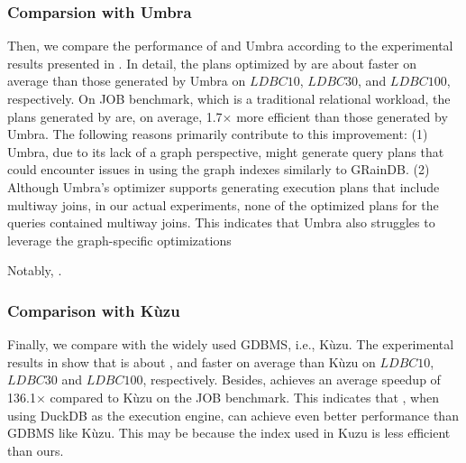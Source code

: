 \subsubsection{Comparsion with Umbra}
Then, we compare the performance of \name and Umbra according to the experimental results presented in .
In detail, the plans optimized by \name are about  faster on average than those generated by Umbra on $LDBC10$, $LDBC30$, and $LDBC100$, respectively.
On JOB benchmark, which is a traditional relational workload, the plans generated by \name are, on average, 1.7$\times$ more efficient than those generated by Umbra.
The following reasons primarily contribute to this improvement:
(1) Umbra, due to its lack of a graph perspective, might generate query plans that could encounter issues in using the graph indexes similarly to GRainDB.
(2) Although Umbra's optimizer supports generating execution plans that include multiway joins, in our actual experiments, none of the optimized plans for the queries contained multiway joins. This indicates that Umbra also struggles to leverage the graph-specific optimizations

Notably, .


\subsubsection{Comparison with K\`uzu}
Finally, we compare \name with the widely used GDBMS, i.e., K\`uzu.
The experimental results in  show that \name is about ,  and  faster on average than K\`uzu on $LDBC10$, $LD BC30$ and $LDBC100$, respectively.
Besides, \name achieves an average speedup of 136.1$\times$ compared to K\`uzu on the JOB benchmark.
This indicates that \name, when using DuckDB as the execution engine, can achieve even better performance than GDBMS like K\`uzu.
This may be because the index used in Kuzu is less efficient than ours.





